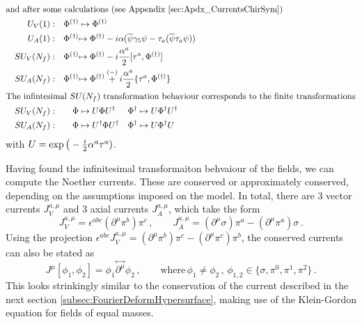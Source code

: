 \begin{subequations}
\begin{align}
        \intertext{and after some calculations (see Appendix \ref{sec:Apdx_CurrentsChirSym})}
         &  & U_V(1): &  & \Phi^{(\dagger)} & \mapsto \Phi^{(\dagger)}                                                              \\
         &  & U_A(1): &  & \Phi^{(\dagger)} & \mathrlap{\mapsto \Phi^{(\dagger)}-\imagu\alpha(\overline{\psi}\gamma_5\psi-\tau_a(\overline{\psi}\tau_a\psi))} &        &                                  \\
         &  & SU_V(N_f): &  & \Phi^{(\dagger)} & \mathrlap{\mapsto \Phi^{(\dagger)}-\imagu\frac{\alpha^a}{2}[\tau^a,\Phi^{(\dagger)}]}  &        &                                                            \\
         &  & SU_A(N_f): &  & \Phi^{(\dagger)} & \mathrlap{\mapsto \Phi^{(\dagger)}\overset{(-)}{+}\imagu\frac{\alpha^a}{2}\{\tau^a,\Phi^{(\dagger)}\}} &        &                                  \\
        \intertext{The infintesimal ${SU(N_f)}$ transformation behaviour corresponds to the finite transformations}
         &  & SU_V(N_f): &  & \Phi & \mapsto U\Phi U^\dagger                                                          &        \Phi^{\dagger} & \mapsto U\Phi^{\dagger}U^\dagger                                  \\
         &  & SU_A(N_f): &  & \Phi             & \mapsto U^\dagger\Phi U^\dagger&\Phi^\dagger&\mapsto U\Phi^\dagger U                 &                                              
    \end{align}
\end{subequations}
with $U=\exp\big(-\frac{{i}}{2}\alpha^a\tau^a)$.

Having found the infinitesimal transformaiton behvaiour of the fields, we can compute the Noether currents. These are conserved or approximately conserved, depending on the assumptions imposed on the model. In total, there are 3 vector currents $J_V^{a,\mu}$ and 3 axial currents $J_A^{a,\mu}$, which take the form
\begin{equation}
    J_V^{a,\mu}=\epsilon^{abc}(\partial^\mu\pi^b)\pi^c\,,\qquad J_A^{a,\mu}=(\partial^\mu\sigma)\pi^a-(\partial^\mu\pi^a)\sigma\,.
\end{equation}
Using the projection $\epsilon^{abc}J_V^{a,\mu}=(\partial^\mu\pi^b)\pi^c-(\partial^\mu\pi^c)\pi^b$, the conserved currents can also be stated as
\begin{equation}
    J^\mu[\phi_1,\phi_2]=\phi_1\overset{\leftrightarrow}{\partial^\mu}\phi_2\,,\qquad\text{where}\,\phi_{1}\neq\phi_2\,,\,\phi_{1,2}\in\{\sigma,\pi^0,\pi^1,\pi^2\}\,.
\end{equation}
This looks strinkingly similar to the conservation of the current described in the next section \eqref{subsec:FourierDeformHypersurface}, making use of the Klein-Gordon equation for fields of equal masses. 



